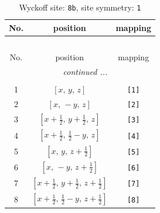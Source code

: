 \documentclass[fleqn,8pt]{jsarticle}
\begin{document}
\begin{longtable}{ccc}
\caption{Wyckoff site: {\tt 8b}, site symmetry: {\tt 1}}
 \\
 \hline \hline
No. & position & mapping \\ \hline \endfirsthead

\multicolumn{2}{l}{\tablename\ \thetable{}} \\
 \hline \hline
No. & position & mapping \\ \hline \endhead

 \hline \hline
\multicolumn{2}{r}{\footnotesize\it continued ...} \\ \endfoot

 \hline \hline
\multicolumn{2}{r}{} \\ \endlastfoot

1 & $\left[ x,\, y,\, z \right]$ & {\tt [1]} \\ \hline
2 & $\left[ x,\, - y,\, z \right]$ & {\tt [2]} \\ \hline
3 & $\left[ x + \frac{1}{2},\, y + \frac{1}{2},\, z \right]$ & {\tt [3]} \\ \hline
4 & $\left[ x + \frac{1}{2},\, \frac{1}{2} - y,\, z \right]$ & {\tt [4]} \\ \hline
5 & $\left[ x,\, y,\, z + \frac{1}{2} \right]$ & {\tt [5]} \\ \hline
6 & $\left[ x,\, - y,\, z + \frac{1}{2} \right]$ & {\tt [6]} \\ \hline
7 & $\left[ x + \frac{1}{2},\, y + \frac{1}{2},\, z + \frac{1}{2} \right]$ & {\tt [7]} \\ \hline
8 & $\left[ x + \frac{1}{2},\, \frac{1}{2} - y,\, z + \frac{1}{2} \right]$ & {\tt [8]} \\
\end{longtable}
\end{document}
